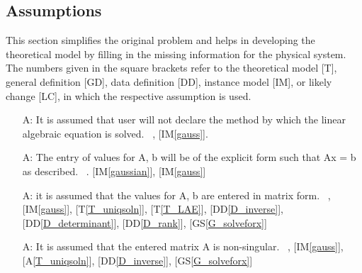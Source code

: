 \documentclass[12pt]{article}
\newcommand{\ddref}[1]{DD\ref{#1}}
\newcommand{\tref}[1]{T\ref{#1}}
\newcounter{assumpnum} %
\newcommand{\aref}[1]{A\ref{#1}}
\newcommand{\gsref}[1]{GS\ref{#1}}
\newcommand{\iref}[1]{IM\ref{#1}}
\begin{document}
{\subsection{Assumptions}

This section simplifies the original problem and helps in developing the
theoretical model by filling in the missing information for the physical
system. The numbers given in the square brackets refer to the theoretical model
[T], general definition [GD], data definition [DD], instance model [IM], or
likely change [LC], in which the respective assumption is used.

\begin{itemize}

\item[A\refstepcounter{assumpnum}\theassumpnum \label{A_programcall}:]
It is assumed that user will not declare the method by which the linear algebraic equation is solved.
~\newline
 [\iref{gaussian}], [\iref{gauss}].


\item[A\refstepcounter{assumpnum}\theassumpnum \label{A_explicit}:]
The entry of values for A, b will be of the explicit form such that Ax = b as described.
~\newline
 [\tref{T_LAE}]. [\iref{gaussian}], [\iref{gauss}]


\item[A\refstepcounter{assumpnum}\theassumpnum \label{A_matrixform}:]
it is assumed that the values for A, b are entered in matrix form.
~\newline
 [\iref{gaussian}], [\iref{gauss}], [\tref{T_uniqsoln}], [\tref{T_LAE}], [\ddref{D_inverse}], [\ddref{D_determinant}], [\ddref{D_rank}], [\gsref{G_solveforx}]


\item[A\refstepcounter{assumpnum}\theassumpnum \label{A_unique}:]
It is assumed that the entered matrix A is non-singular. 
~\newline
[\iref{gaussian}], [\iref{gauss}], [\aref{T_uniqsoln}], [\ddref{D_inverse}], [\gsref{G_solveforx}]


\end{itemize}}
\end{document}
